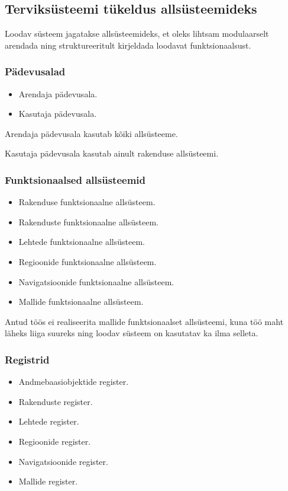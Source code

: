 \documentclass[a4paper,12pt]{article} %
\begin{document}
\subsection{Terviksüsteemi tükeldus allsüsteemideks}
Loodav süsteem jagatakse allsüsteemideks, et oleks lihtsam modulaarselt arendada ning struktureeritult kirjeldada loodavat funktsionaalsust.
\subsubsection{Pädevusalad}
\begin{itemize}
\item Arendaja pädevusala.
\item Kasutaja pädevusala.
\end{itemize}
Arendaja pädevusala kasutab kõiki allsüsteeme.\par
Kasutaja pädevusala kasutab ainult rakenduse allsüsteemi.
\subsubsection{Funktsionaalsed allsüsteemid}
\begin{itemize}
\item Rakenduse funktsionaalne allsüsteem.
\item Rakenduste funktsionaalne allsüsteem.
\item Lehtede funktsionaalne allsüsteem.
\item Regioonide funktsionaalne allsüsteem.
\item Navigatsioonide funktsionaalne allsüsteem.
\item Mallide funktsionaalne allsüsteem.
\end{itemize}
Antud töös ei realiseerita mallide funktsionaalset allsüsteemi, kuna töö maht läheks liiga suureks ning loodav süsteem on kasutatav ka ilma selleta.
\subsubsection{Registrid}
\begin{itemize}
\item Andmebaasiobjektide register.
\item Rakenduste register.
\item Lehtede register.
\item Regioonide register.
\item Navigatsioonide register.
\item Mallide register.
\end{itemize}
\end{document}
